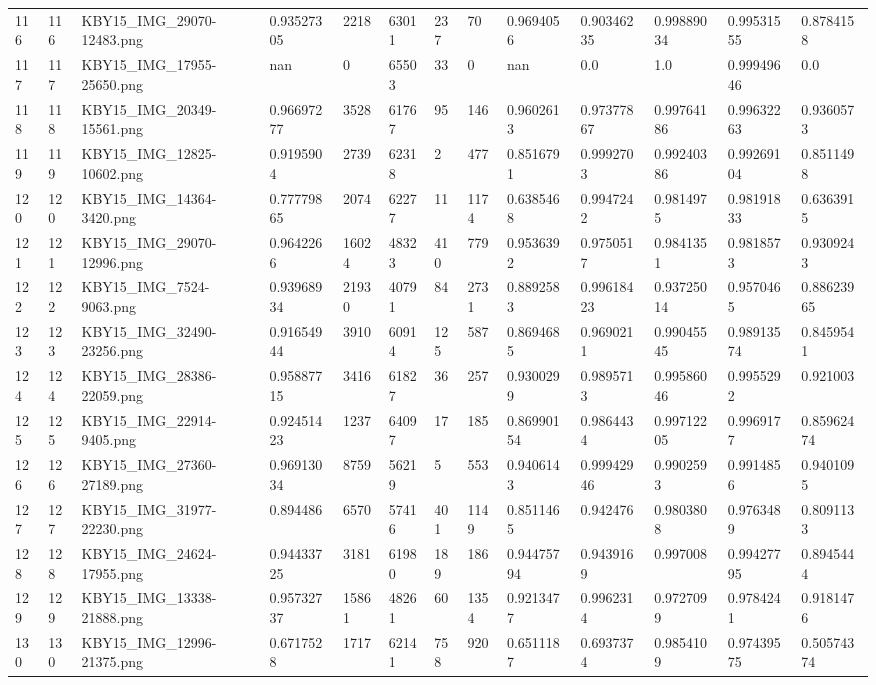 \documentclass[11pt, a4paper, twoside]{report}
\begin{document}
\begin{longtable}[c]{@{}lllllllllllll@{}}
116 & 116 & KBY15\_IMG\_29070-12483.png & 0.93527305 & 2218 & 63011 & 237 & 70 & 0.9694056 & 0.90346235 & 0.99889034 & 0.99531555 & 0.8784158 \\
117 & 117 & KBY15\_IMG\_17955-25650.png & nan & 0 & 65503 & 33 & 0 & nan & 0.0 & 1.0 & 0.99949646 & 0.0 \\
118 & 118 & KBY15\_IMG\_20349-15561.png & 0.96697277 & 3528 & 61767 & 95 & 146 & 0.9602613 & 0.97377867 & 0.99764186 & 0.99632263 & 0.9360573 \\
119 & 119 & KBY15\_IMG\_12825-10602.png & 0.9195904 & 2739 & 62318 & 2 & 477 & 0.8516791 & 0.9992703 & 0.99240386 & 0.99269104 & 0.8511498 \\
120 & 120 & KBY15\_IMG\_14364-3420.png & 0.77779865 & 2074 & 62277 & 11 & 1174 & 0.6385468 & 0.9947242 & 0.9814975 & 0.98191833 & 0.6363915 \\
121 & 121 & KBY15\_IMG\_29070-12996.png & 0.9642266 & 16024 & 48323 & 410 & 779 & 0.9536392 & 0.9750517 & 0.9841351 & 0.9818573 & 0.9309243 \\
122 & 122 & KBY15\_IMG\_7524-9063.png & 0.93968934 & 21930 & 40791 & 84 & 2731 & 0.8892583 & 0.99618423 & 0.93725014 & 0.9570465 & 0.88623965 \\
123 & 123 & KBY15\_IMG\_32490-23256.png & 0.91654944 & 3910 & 60914 & 125 & 587 & 0.8694685 & 0.9690211 & 0.99045545 & 0.98913574 & 0.8459541 \\
124 & 124 & KBY15\_IMG\_28386-22059.png & 0.95887715 & 3416 & 61827 & 36 & 257 & 0.9300299 & 0.9895713 & 0.99586046 & 0.9955292 & 0.921003 \\
125 & 125 & KBY15\_IMG\_22914-9405.png & 0.92451423 & 1237 & 64097 & 17 & 185 & 0.86990154 & 0.9864434 & 0.99712205 & 0.9969177 & 0.85962474 \\
126 & 126 & KBY15\_IMG\_27360-27189.png & 0.96913034 & 8759 & 56219 & 5 & 553 & 0.9406143 & 0.99942946 & 0.9902593 & 0.9914856 & 0.9401095 \\
127 & 127 & KBY15\_IMG\_31977-22230.png & 0.894486 & 6570 & 57416 & 401 & 1149 & 0.8511465 & 0.942476 & 0.9803808 & 0.9763489 & 0.8091133 \\
128 & 128 & KBY15\_IMG\_24624-17955.png & 0.94433725 & 3181 & 61980 & 189 & 186 & 0.94475794 & 0.9439169 & 0.997008 & 0.99427795 & 0.8945444 \\
129 & 129 & KBY15\_IMG\_13338-21888.png & 0.95732737 & 15861 & 48261 & 60 & 1354 & 0.9213477 & 0.9962314 & 0.9727099 & 0.9784241 & 0.9181476 \\
130 & 130 & KBY15\_IMG\_12996-21375.png & 0.6717528 & 1717 & 62141 & 758 & 920 & 0.6511187 & 0.6937374 & 0.9854109 & 0.97439575 & 0.50574374 \\

\end{longtable}
\end{document}
